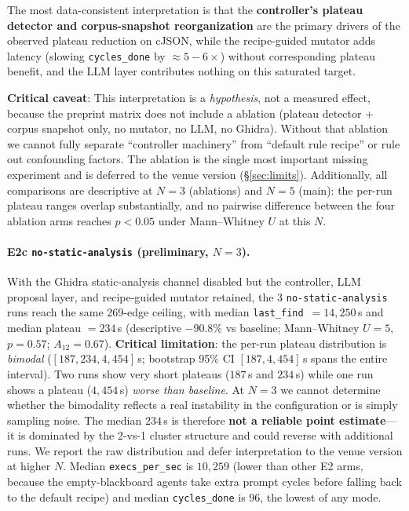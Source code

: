 \documentclass[11pt]{article}
\begin{document}
The most data-consistent interpretation is that the
\textbf{controller's plateau detector and corpus-snapshot
reorganization} are the primary drivers of the observed plateau
reduction on cJSON, while the recipe-guided mutator adds latency
(slowing \texttt{cycles\_done} by $\approx 5{-}6\times$) without
corresponding plateau benefit, and the LLM layer contributes nothing
on this saturated target.

\textbf{Critical caveat}: This interpretation is a \emph{hypothesis},
not a measured effect, because the preprint matrix does not include a
 ablation (plateau detector + corpus snapshot
only, no mutator, no LLM, no Ghidra). Without that ablation we cannot
fully separate ``controller machinery'' from ``default rule recipe''
or rule out confounding factors. The 
ablation is the single most important missing experiment and is
deferred to the venue version (\S\ref{sec:limits}). Additionally, all
comparisons are descriptive at $N{=}3$ (ablations) and $N{=}5$
(main): the per-run plateau ranges overlap substantially, and no
pairwise difference between the four ablation arms
reaches $p{<}0.05$ under Mann--Whitney $U$ at this $N$.

\paragraph{E2c \texttt{no-\allowbreak static-\allowbreak analysis} (preliminary, $N{=}3$).}
With the Ghidra static-analysis channel disabled but the controller,
LLM proposal layer, and recipe-guided mutator retained, the 3
\texttt{no-\allowbreak static-\allowbreak analysis} runs reach the same 269-edge ceiling,
with median \texttt{last\_find}~$=14{,}250$\,s and median plateau
$=234$\,s (descriptive $-90.8\%$ vs baseline; Mann--Whitney
$U{=}5$, $p{=}0.57$; $A_{12}{=}0.67$). \textbf{Critical limitation}:
the per-run plateau distribution is \emph{bimodal} ($[187, 234,
4{,}454]$\,s; bootstrap 95\% CI $[187, 4{,}454]$\,s spans the entire
interval). Two runs show very short plateaus ($187$\,s and $234$\,s)
while one run shows a plateau ($4{,}454$\,s) \emph{worse than
baseline}. At $N{=}3$ we cannot determine whether the bimodality
reflects a real instability in the 
configuration or is simply sampling noise. The median $234$\,s is
therefore \textbf{not a reliable point estimate}---it is dominated by
the 2-vs-1 cluster structure and could reverse with additional runs.
We report the raw distribution and defer interpretation to the venue
version at higher $N$. Median \texttt{execs\_per\_sec} is $10{,}259$
(lower than other E2 arms, because the empty-blackboard agents take
extra prompt cycles before falling back to the default recipe) and
median \texttt{cycles\_done} is $96$, the lowest of any mode.
\end{document}
